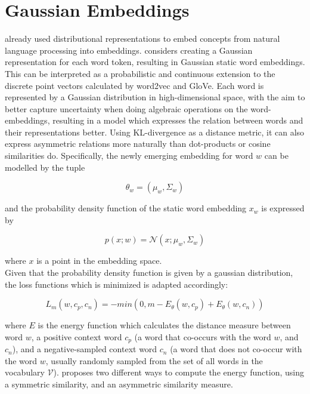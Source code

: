 \documentclass[a4paper,12pt,oneside,openright]{report}
\begin{document}
\section{Gaussian Embeddings}\label{appendix:GaussianEmbeddings}

\cite{bengio06} already used distributional representations to embed concepts from natural language processing into embeddings.
\cite{vilnis14} considers creating a Gaussian representation for each word token, resulting in Gaussian static word embeddings.
This can be interpreted as a probabilistic and continuous extension to the discrete point vectors calculated by word2vec and GloVe.
Each word is represented by a Gaussian distribution in high-dimensional space, with the aim to better capture uncertainty when doing algebraic operations on the word-embeddings, resulting in a model which expresses the relation between words and their representations better.
Using KL-divergence as a distance metric, it can also express asymmetric relations more naturally than dot-products or cosine similarities do.  
Specifically, the newly emerging embedding for word $w$ can be modelled by the tuple 

$$
\theta_w = ( \mu_w,  \Sigma_w)
$$

and the probability density function of the static word embedding $x_w$ is expressed by

\begin{equation}
p(x; w) = \mathcal{N}\left(x ; \mu_{w}, \Sigma_{w}\right)
\end{equation}

where $x$ is a point in the embedding space. \\

Given that the probability density function is given by a gaussian distribution, the loss functions which is minimized is adapted accordingly:

\begin{equation}
L_m(w, c_p, c_n) = - min(0, m - E_\theta(w, c_p) + E_\theta(w, c_n) )
\end{equation}

where $E$ is the energy function which calculates the distance measure between word $w$, a positive context word $c_p$ (a word that co-occurs with the word $w$, and $c_n$), and a negative-sampled context word $c_n$ (a word that does not co-occur with the word $w$, usually randomly sampled from the set of all words in the vocabulary $\mathcal{V}$).
\cite{vilnis14} proposes two different ways to compute the energy function, using a symmetric similarity, and an asymmetric similarity measure. \\
\end{document}
